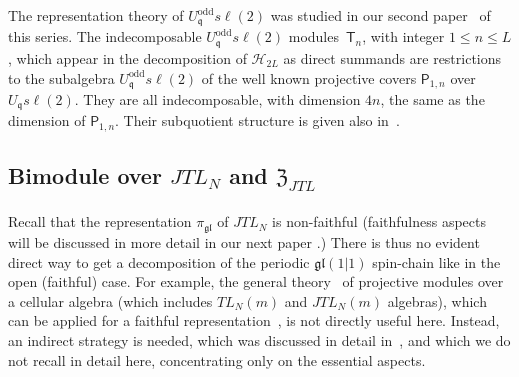 \documentclass[11pt]{article}
\newcommand{\q}{\mathfrak{q}}
\newcommand{\TL}[1]{TL_{#1}}
\newcommand{\JTL}[1]{JTL_{#1}}
\newcommand{\LQG}{U_{\q} s\ell(2)}
\newcommand{\LQGodd}{U^{\text{odd}}_{\q} s\ell(2)}
\newcommand{\Hilb}{\mathcal{H}}
\newcommand{\gl}{\mathfrak{gl}}
\newcommand{\repgl}{\pi_{\gl}}
\newcommand{\cent}{\mathfrak{Z}}
\newcommand{\centJTL}{\cent_{\JTL{}}}
\newcommand{\PP}{\mathsf{P}}
\newcommand{\PPodd}[1]{\mathsf{T}_{#1}}
\theoremstyle{definition}
\begin{document}
The representation theory of $\LQGodd$ was studied in our second paper~\cite{GRS2} of this series. The
indecomposable $\LQGodd$ modules~$\PPodd{n}$, with integer $1\leq n\leq L$, which
appear in the decomposition of $\Hilb_{2L}$ as direct summands are restrictions to the subalgebra $\LQGodd$
of the well known projective covers $\PP_{1,n}$ over $\LQG$. They are all
indecomposable, with dimension $4n$, the same as the dimension of
$\PP_{1,n}$.  Their subquotient structure is given also
in~\cite[Sec.~3.3]{GRS2}.



\subsection{Bimodule over $\JTL{N}$ and $\centJTL$}\label{ind-chain-bimod-subsec}

Recall that the representation $\repgl$ of $\JTL{N}$ is non-faithful (faithfulness
aspects will be discussed in more detail in our next paper
\cite{GRS4}.) There is thus no evident direct way to get a
decomposition of the periodic $\gl(1|1)$ spin-chain like in the open (faithful) case. For
example, the general theory~\cite{GL0} of projective modules over a
cellular algebra (which includes $\TL{N}(m)$ and $\JTL{N}(m)$
algebras), which can be applied for a faithful representation~\cite{GRS4}, is not directly useful here. Instead, an indirect
strategy is needed, which was discussed in detail in~\cite[Sec~5.2]{GRS2}, and
which we do not recall in detail here, concentrating only on the
essential aspects.
\end{document}
